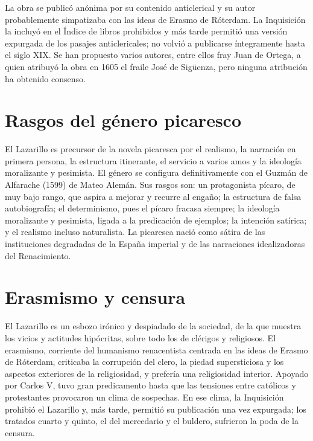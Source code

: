\documentclass{book}
\begin{document}
La obra se publicó anónima por su contenido anticlerical y su autor probablemente simpatizaba con las ideas de Erasmo de Róterdam. La Inquisición la incluyó en el Índice de libros prohibidos y más tarde permitió una versión expurgada de los pasajes anticlericales; no volvió a publicarse íntegramente hasta el siglo XIX. Se han propuesto varios autores, entre ellos fray Juan de Ortega, a quien atribuyó la obra en 1605 el fraile José de Sigüenza, pero ninguna atribución ha obtenido consenso.


\section{Rasgos del género picaresco}

El Lazarillo es precursor de la novela picaresca por el realismo, la narración en primera persona, la estructura itinerante, el servicio a varios amos y la ideología moralizante y pesimista. El género se configura definitivamente con el Guzmán de Alfarache (1599) de Mateo Alemán. Sus rasgos son: un protagonista pícaro, de muy bajo rango, que aspira a mejorar y recurre al engaño; la estructura de falsa autobiografía; el determinismo, pues el pícaro fracasa siempre; la ideología moralizante y pesimista, ligada a la predicación de ejemplos; la intención satírica; y el realismo incluso naturalista. La picaresca nació como sátira de las instituciones degradadas de la España imperial y de las narraciones idealizadoras del Renacimiento.


\section{Erasmismo y censura}

El Lazarillo es un esbozo irónico y despiadado de la sociedad, de la que muestra los vicios y actitudes hipócritas, sobre todo los de clérigos y religiosos. El erasmismo, corriente del humanismo renacentista centrada en las ideas de Erasmo de Róterdam, criticaba la corrupción del clero, la piedad supersticiosa y los aspectos exteriores de la religiosidad, y prefería una religiosidad interior. Apoyado por Carlos V, tuvo gran predicamento hasta que las tensiones entre católicos y protestantes provocaron un clima de sospechas. En ese clima, la Inquisición prohibió el Lazarillo y, más tarde, permitió su publicación una vez expurgada; los tratados cuarto y quinto, el del mercedario y el buldero, sufrieron la poda de la censura.
\end{document}

